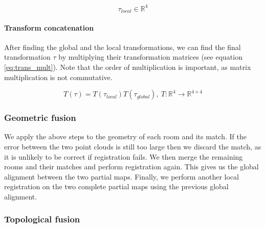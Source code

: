 \begin{equation}
    \tau_{local} \in \mathbb{R}^4
\end{equation}


\paragraph{Transform concatenation}
After finding the global and the local transformations, we can find the final transformation \(\tau\) by multiplying their transformation matrices (see equation \ref{eq:trans_mult}). Note that the order of multiplication is important, as matrix multiplication is not commutative.

\begin{equation}
    \label{eq:trans_mult}
    T(\tau) = T(\tau_{local})T(\tau_{global}),\ T: \mathbb{R}^4 \rightarrow \mathbb{R}^{4 \times 4}
\end{equation}

\subsubsection{Geometric fusion}
We apply the above steps to the geometry of each room and its match. If the error between the two point clouds is still too large then we discard the match, as it is unlikely to be correct if registration fails. We then merge the remaining rooms and their matches and perform registration again. This gives us the global alignment between the two partial maps. Finally, we perform another local registration on the two complete partial maps using the previous global alignment. 

\subsubsection{Topological fusion}


